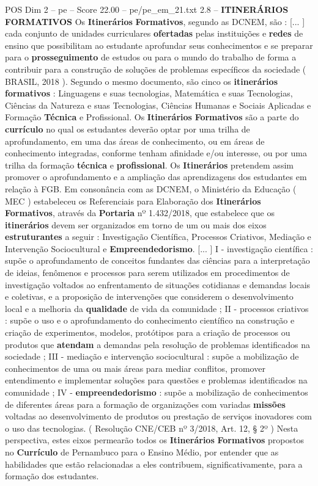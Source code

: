 \begin{textsample}{POS Dim 2 – pe – Score 22.00 – pe/pe\_em\_21.txt}  \label{ex:f2_pos_252}
2.8 – \textbf{ITINERÁRIOS} \textbf{FORMATIVOS} Os \textbf{Itinerários} \textbf{Formativos}, segundo as DCNEM, são : [... ] cada conjunto de unidades curriculares \textbf{ofertadas} pelas instituições e \textbf{redes} de ensino que possibilitam ao estudante aprofundar seus conhecimentos e se preparar para o \textbf{prosseguimento} de estudos ou para o mundo do trabalho de forma a contribuir para a construção de soluções de problemas específicos da sociedade ( BRASIL, 2018 ).
Segundo o mesmo documento, são cinco os \textbf{itinerários} \textbf{formativos} : Linguagens e suas tecnologias, Matemática e suas Tecnologias, Ciências da Natureza e suas Tecnologias, Ciências Humanas e Sociais Aplicadas e Formação \textbf{Técnica} e Profissional.
Os \textbf{Itinerários} \textbf{Formativos} são a parte do \textbf{currículo} no qual os estudantes deverão optar por uma trilha de aprofundamento, em uma das áreas de conhecimento, ou em áreas de conhecimento integradas, conforme tenham afinidade e/ou interesse, ou por uma trilha da formação \textbf{técnica} e \textbf{profissional}.
Os \textbf{Itinerários} pretendem assim promover o aprofundamento e a ampliação das aprendizagens dos estudantes em relação à FGB.
Em consonância com as DCNEM, o Ministério da Educação ( MEC ) estabeleceu os Referenciais para Elaboração dos \textbf{Itinerários} \textbf{Formativos}, através da \textbf{Portaria} nº 1.432/2018, que estabelece que os \textbf{itinerários} devem ser organizados em torno de um ou mais dos eixos \textbf{estruturantes} a seguir : Investigação Científica, Processos Criativos, Mediação e Intervenção Sociocultural e \textbf{Empreendedorismo}. [... ] I - investigação científica : supõe o aprofundamento de conceitos fundantes das ciências para a interpretação de ideias, fenômenos e processos para serem utilizados em procedimentos de investigação voltados ao enfrentamento de situações cotidianas e demandas locais e coletivas, e a proposição de intervenções que considerem o desenvolvimento local e a melhoria da \textbf{qualidade} de vida da comunidade ; II - processos criativos : supõe o uso e o aprofundamento do conhecimento científico na construção e criação de experimentos, modelos, protótipos para a criação de processos ou produtos que \textbf{atendam} a demandas pela resolução de problemas identificados na sociedade ; III - mediação e intervenção sociocultural : supõe a mobilização de conhecimentos de uma ou mais áreas para mediar conflitos, promover entendimento e implementar soluções para questões e problemas identificados na comunidade ; IV - \textbf{empreendedorismo} : supõe a mobilização de conhecimentos de diferentes áreas para a formação de organizações com variadas \textbf{missões} voltadas ao desenvolvimento de produtos ou prestação de serviços inovadores com o uso das tecnologias. ( Resolução CNE/CEB nº 3/2018, Art. 12, § 2º ) Nesta perspectiva, estes eixos permearão todos os \textbf{Itinerários} \textbf{Formativos} propostos no \textbf{Currículo} de Pernambuco para o Ensino Médio, por entender que as habilidades que estão relacionadas a eles contribuem, significativamente, para a formação dos estudantes.

\end{textsample}
